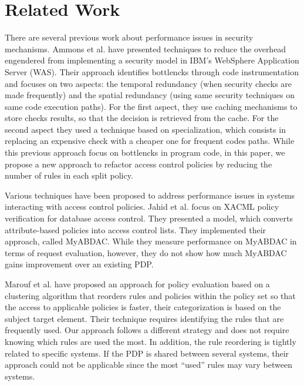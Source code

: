 \section{Related Work} \label{sec:related}

There are several previous work about performance issues in security mechanisms.
Ammons et al.\cite{largesystems} have presented techniques to reduce the overhead engendered from implementing a security model 
in IBM's WebSphere Application Server (WAS). Their approach identifies bottlencks through code instrumentation and focuses on two aspects: the temporal redundancy (when security checks are made frequently) and the spatial redundancy
(using same security techniques on same code execution paths).
For the first aspect, they use caching mechanisms to store checks results, so that the decision is retrieved from the cache.
For the second aspect they used a technique based on specialization, which consists in replacing an expensive check with a cheaper one for frequent codes paths.
While this previous approach focus on bottlencks in program code, in this paper, we propose a new approach to refactor access control policies by reducing the number of rules in each split policy.

Various techniques \cite{MyABDAC, clustering, decomposition} have been proposed to address performance issues in systems interacting with access control policies. 
Jahid et al. \cite{MyABDAC} focus on XACML
policy verification for database access control. They presented a model, which converts attribute-based policies into access control lists. They implemented their approach, called MyABDAC.
While they measure performance on MyABDAC in terms of request evaluation, however, they do not show how much MyABDAC
gains improvement over an existing PDP.


Marouf et al. \cite{clustering} have proposed an approach for policy evaluation based on a 
clustering algorithm that reorders rules and policies within the policy set so that the access to applicable policies is faster, their categorization is based on
 the subject target element. Their technique requires identifying the rules that are frequently used. Our approach follows a different strategy and does not require knowing which 
rules are used the most. In addition, the rule reordering is tightly related to specific systems. If the PDP is shared between several
 systems, their approach could not be applicable since the most ``used'' rules may vary between systems. \\


